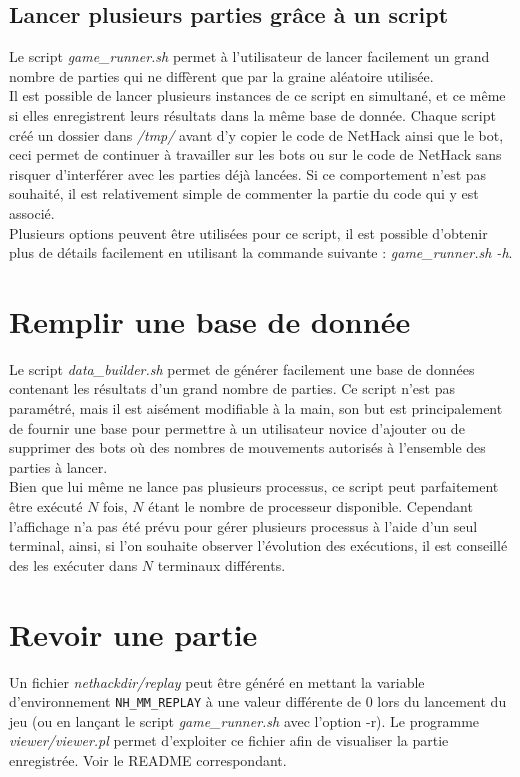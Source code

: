 \documentclass[10pt,a4paper]{report}
\begin{document}
\subsection{Lancer plusieurs parties grâce à un script}
Le script \emph{game\_runner.sh} permet à l'utilisateur de lancer facilement
un grand nombre de parties qui ne diffèrent que par la graine aléatoire
utilisée.
\\
Il est possible de lancer plusieurs instances de ce script en simultané, et ce
même si elles enregistrent leurs résultats dans la même base de donnée. Chaque
script créé un dossier dans \emph{/tmp/} avant d'y copier le code de NetHack ainsi que
le bot, ceci permet de continuer à travailler sur les bots ou sur le code de
NetHack sans risquer d'interférer avec les parties déjà lancées. Si ce
comportement n'est pas souhaité, il est relativement simple de commenter la
partie du code qui y est associé.
\\
Plusieurs options peuvent être utilisées pour ce script, il est possible
d'obtenir plus de détails facilement en utilisant la commande suivante :
\emph{game\_runner.sh -h}.

\section{Remplir une base de donnée}
Le script \emph{data\_builder.sh} permet de générer facilement une base de
données contenant les résultats d'un grand nombre de parties. Ce script n'est
pas paramétré, mais il est aisément modifiable à la main, son but est
principalement de fournir une base pour permettre à un utilisateur novice
d'ajouter ou de supprimer des bots où des nombres de mouvements autorisés à
l'ensemble des parties à lancer.
\\
Bien que lui même ne lance pas plusieurs processus, ce script peut
parfaitement être exécuté $N$ fois, $N$ étant le nombre de processeur
disponible. Cependant l'affichage n'a pas été prévu pour gérer plusieurs
processus à l'aide d'un seul terminal, ainsi, si l'on souhaite observer
l'évolution des exécutions, il est conseillé des les exécuter dans $N$
terminaux différents.

\section{Revoir une partie}

Un fichier \emph{nethackdir/replay} peut être généré en mettant la variable
d'environnement \verb!NH_MM_REPLAY! à une valeur différente de 0 lors du
lancement du jeu (ou en lançant le script \emph{game\_runner.sh} avec l'option
-r). Le programme \emph{viewer/viewer.pl} permet d'exploiter ce fichier afin
de visualiser la partie enregistrée. Voir le README correspondant.
\end{document}

